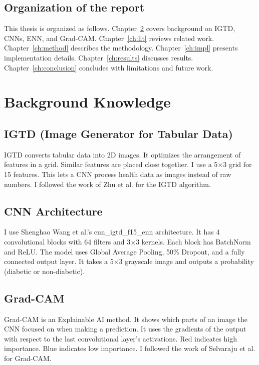 \documentclass[12pt]{dalthesis}
\begin{document}
\section{Organization of the report}

This thesis is organized as follows. Chapter~\ref{ch:background} covers background on IGTD, CNNs, ENN, and Grad-CAM. Chapter~\ref{ch:lit} reviews related work. Chapter~\ref{ch:method} describes the methodology. Chapter~\ref{ch:impl} presents implementation details. Chapter~\ref{ch:results} discusses results. Chapter~\ref{ch:conclusion} concludes with limitations and future work.

\chapter{Background Knowledge}\label{ch:background}

\section{IGTD (Image Generator for Tabular Data)}

IGTD converts tabular data into 2D images. It optimizes the arrangement of features in a grid. Similar features are placed close together. I use a 5$\times$3 grid for 15 features. This lets a CNN process health data as images instead of raw numbers. I followed the work of Zhu et al. for the IGTD algorithm.

\section{CNN Architecture}

I use Shenghao Wang et al.'s cnn\_igtd\_f15\_enn architecture. It has 4 convolutional blocks with 64 filters and 3$\times$3 kernels. Each block has BatchNorm and ReLU. The model uses Global Average Pooling, 50\% Dropout, and a fully connected output layer. It takes a 5$\times$3 grayscale image and outputs a probability (diabetic or non-diabetic).

\section{Grad-CAM}

Grad-CAM is an Explainable AI method. It shows which parts of an image the CNN focused on when making a prediction. It uses the gradients of the output with respect to the last convolutional layer's activations. Red indicates high importance. Blue indicates low importance. I followed the work of Selvaraju et al. for Grad-CAM.
\end{document}
